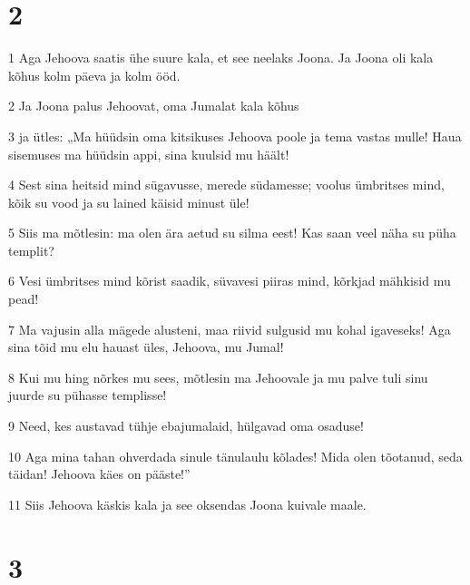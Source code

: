 \chapter{2}

\par 1 Aga Jehoova saatis ühe suure kala, et see neelaks Joona. Ja Joona oli kala kõhus kolm päeva ja kolm ööd.
\par 2 Ja Joona palus Jehoovat, oma Jumalat kala kõhus
\par 3 ja ütles: „Ma hüüdsin oma kitsikuses Jehoova poole ja tema vastas mulle! Haua sisemuses ma hüüdsin appi, sina kuulsid mu häält!
\par 4 Sest sina heitsid mind sügavusse, merede südamesse; voolus ümbritses mind, kõik su vood ja su lained käisid minust üle!
\par 5 Siis ma mõtlesin: ma olen ära aetud su silma eest! Kas saan veel näha su püha templit?
\par 6 Vesi ümbritses mind kõrist saadik, süvavesi piiras mind, kõrkjad mähkisid mu pead!
\par 7 Ma vajusin alla mägede alusteni, maa riivid sulgusid mu kohal igaveseks! Aga sina tõid mu elu hauast üles, Jehoova, mu Jumal!
\par 8 Kui mu hing nõrkes mu sees, mõtlesin ma Jehoovale ja mu palve tuli sinu juurde su pühasse templisse!
\par 9 Need, kes austavad tühje ebajumalaid, hülgavad oma osaduse!
\par 10 Aga mina tahan ohverdada sinule tänulaulu kõlades! Mida olen tõotanud, seda täidan! Jehoova käes on pääste!”
\par 11 Siis Jehoova käskis kala ja see oksendas Joona kuivale maale.

\chapter{3}

